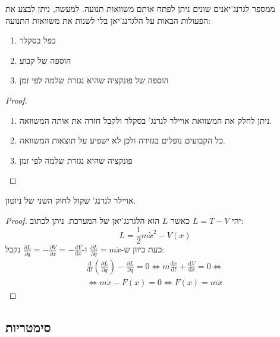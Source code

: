 \documentclass{tstextbook}
\begin{document}
\begin{theorem}
ממספר לגרנג'יאנים שונים ניתן לפתח אותם משוואות תנועה. למעשה, ניתן לבצע את הפעולות הבאות על הלגרנג'יאן בלי לשנות את משוואות התנועה:

  \begin{enumerate}
    \item כפל בסקלר 


    \item הוספה של קבוע 


    \item הוספה של פונקציה שהיא נגזרת שלמה לפי זמן 


  \end{enumerate}
\end{theorem}
\begin{proof}
  \begin{enumerate}
    \item ניתן לחלק את המשוואת אויילר לגרנג' בסקלר ולקבל חזרה את אותה המשוואה. 


    \item כל הקבועים נופלים בגזירה ולכן לא ישפיע על תוצאות המשוואה. 


    \item פונקציה שהיא נגזרת שלמה לפי זמן 


  \end{enumerate}
\end{proof}
\begin{proposition}
אויילר לגרנג' שקול לחוק השני של ניוטון.

\end{proposition}
\begin{proof}
יהי \(L=T-V\) כאשר \(L\) הוא הלגרנג'יאן של המערכת. ניתן לכתוב:
$$L=\frac{1}{2}m\dot{x}^{2}-V(x)$$
כעת כיוון ש-\(\frac{\partial L}{\partial \dot{q}}=m\dot{x}\) ו-\(\frac{\partial L}{\partial q}=-\frac{\partial V}{\partial x}=-\frac{\mathrm{d} V}{\mathrm{d} x}\) נקבל:
$$\begin{gather}\frac{\mathrm{d} }{\mathrm{d} t} \left( \frac{\partial L}{\partial \dot{q}}  \right)-\frac{\partial L}{\partial q} =0 \iff m\frac{\mathrm{d} \dot{x}}{\mathrm{d} t} +\frac{\mathrm{d} V}{\mathrm{d} x} =0\iff  \\\iff m\ddot{x}-F(x)=0\iff F(x)=m\ddot{x}
\end{gather}$$

\end{proof}
\subsection{סימטריות}
\end{document}
